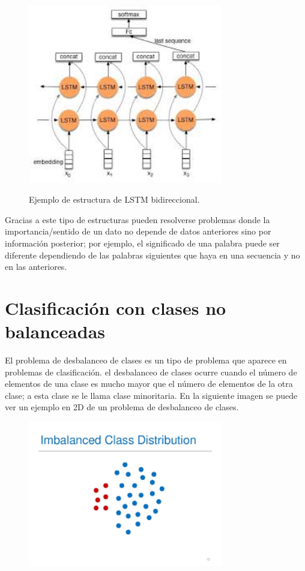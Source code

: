\begin{figure}[h]
	\centering
	\includegraphics[width=85mm]{imagenes/bidi-lstm.jpg}
	\label{fig:23}
	\caption{Ejemplo de estructura de LSTM bidireccional.}
\end{figure}
\verticalspace
Gracias a este tipo de estructuras pueden resolverse problemas donde la importancia/sentido de un dato no depende de datos anteriores sino por información posterior; por ejemplo, el significado de una palabra puede ser diferente dependiendo de las palabras siguientes que haya en una secuencia y no en las anteriores.
\newpage
\section{Clasificación con clases no balanceadas}
El problema de desbalanceo de clases es un tipo de problema que aparece en problemas de clasificación. el desbalanceo de clases ocurre cuando el número de elementos de una clase es mucho mayor que el número de elementos de la otra clase; a esta clase se le llama clase minoritaria. En la siguiente imagen se puede ver un ejemplo en 2D de un problema de desbalanceo de clases.\newline

\begin{figure}[h]
	\centering
	\includegraphics[width=85mm]{imagenes/imbalance_class.png}
	\label{fig:24}
	
\end{figure}
\verticalspace


